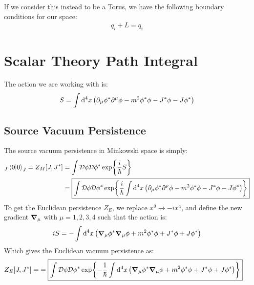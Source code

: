 \documentclass[12pt]{article}
\newcommand{\cD}{\mathcal{D}}
\newcommand{\D}{\partial}
\newcommand{\phis}{\phi^*}
\begin{document}
If we consider this instead to be a Torus, we have the following boundary conditions for our space:
\begin{align*}
  q_i+L=q_i
\end{align*}
\section{Scalar Theory Path Integral}
The action we are working with is:
\begin{align*}
  S=\int\dd[4]{x}\qty(\D_\mu\phi^*\D^\mu\phi-m^2\phi^*\phi-J^*\phi-J\phi^*)
\end{align*}
\subsection{Source Vacuum Persistence}
The source vacuum persistence in Minkowski space is simply:
\begin{align*}
  _J\ip{0}{0}_J=Z_M[J,J^*]&=\int\cD\phi\cD\phi^*\exp{\frac{i}{\hbar}S}\\
  &=\boxed{\int\cD\phi\cD\phi^*\exp{\frac{i}{\hbar}
    \int\dd[4]{x}\qty(\D_\mu\phi^*\D^\mu\phi-m^2\phi^*\phi-J^*\phi-J\phi^*)}}
\end{align*}
To get the Euclidean persistence $Z_E$, we replace $x^0\to -ix^4$, and define the new gradient $\grad_\mu$ with $\mu=1,2,3,4$ such that the action is:
\begin{align*}
  iS=-\int\dd[4]{x}\qty(\grad_\mu\phis\grad_\mu\phi+m^2\phis\phi+J^*\phi+J\phis)
\end{align*}
Which gives the Euclidean vacuum persistence as:
\begin{align*}
  Z_E[J,J^*]=&=\boxed{\int\cD\phi\cD\phi^*\exp{-\frac{1}{\hbar}
    \int\dd[4]{x}\qty(\grad_\mu\phis\grad_\mu\phi+m^2\phis\phi+J^*\phi+J\phis)}}
\end{align*}
\end{document}
